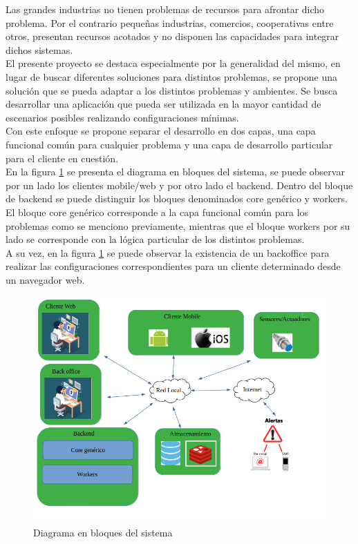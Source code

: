 \documentclass[
11pt, %
]{charter}
\begin{document}
 Las grandes industrias no tienen problemas de recursos para afrontar dicho problema. Por el contrario pequeñas industrias, comercios, cooperativas entre otros, presentan recursos acotados y no disponen las capacidades para integrar dichos sistemas.\\
 El presente proyecto se destaca especialmente por la generalidad del mismo, en lugar de buscar diferentes soluciones para distintos problemas, se propone una solución que se pueda adaptar a los distintos problemas y ambientes. Se busca desarrollar una aplicación que pueda ser utilizada en la mayor cantidad de escenarios posibles realizando configuraciones mínimas.\\
 Con este enfoque se propone separar el desarrollo en dos capas, una capa funcional común para cualquier problema y una capa de desarrollo particular para el cliente en cuestión.\\   
En la figura \ref{fig:diagBloques} se presenta el diagrama en bloques del sistema, se puede observar por un lado los clientes mobile/web y por otro lado el backend. Dentro del bloque de backend se puede distinguir los bloques denominados core genérico y workers. El bloque core genérico corresponde a la capa funcional común para los problemas como se menciono previamente, mientras que el bloque workers por su lado se corresponde con la lógica particular de los distintos problemas.\\
A su vez, en la figura \ref{fig:diagBloques} se puede observar la existencia de un backoffice para realizar las configuraciones correspondientes para un cliente determinado desde un navegador web.


 \begin{figure}[htpb]
\centering 
\includegraphics[width=.8\textwidth]{./Figuras/iot_nico.png}
\caption{Diagrama en bloques del sistema}
\label{fig:diagBloques}
\end{figure}
\end{document}
